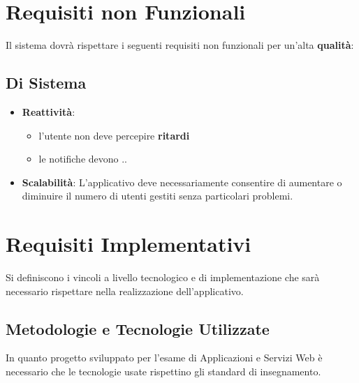     
        
	\section{Requisiti non Funzionali}	
    Il sistema dovrà rispettare i seguenti requisiti non funzionali per un'alta \textbf{qualità}:
        \subsection{Di Sistema}
            \begin{itemize}
                \item \textbf{Reattività}: 
                    \begin{itemize}
                        \item l'utente non deve percepire \textbf{ritardi} 
                        \item le notifiche devono ..
                    \end{itemize}
                \item \textbf{Scalabilità}: L'applicativo deve necessariamente consentire di aumentare o diminuire il numero di utenti gestiti senza particolari problemi. 
            \end{itemize}
        

	\section{Requisiti Implementativi}
	Si definiscono i vincoli a livello tecnologico e di implementazione che sarà necessario rispettare nella realizzazione dell'applicativo.
	
	\subsection{Metodologie e Tecnologie Utilizzate}
	In quanto progetto sviluppato per l'esame di Applicazioni e Servizi Web è necessario che le tecnologie usate rispettino gli standard di insegnamento. 
	